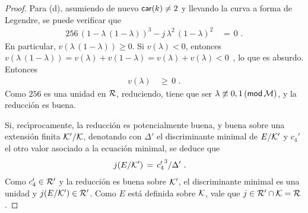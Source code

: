 \begin{proof}
	Para (d), asumiendo de nuevo $\char{k}\not=2$ y llevando la curva a
	forma de Legendre, se puede verificar que
	\begin{align*}
		256\,(1-\lambda\,(1-\lambda))^{3}-
			j\,\lambda^{2}\,(1-\lambda)^{2} & \,=\,0
		\text{ .}
	\end{align*}
	En particular, $v(\lambda\,(1-\lambda))\geq0$. Si $v(\lambda)<0$,
	entonces
	\begin{math}
		v(\lambda\,(1-\lambda))=v(\lambda)+v(1-\lambda)=
			v(\lambda)+v(\lambda)<0
	\end{math}~, lo que es absurdo. Entonces
	\begin{align*}
		v(\lambda) & \,\geq\,0
		\text{ .}
	\end{align*}
	Como $256$ es una unidad en $\cal{R}$, reduciendo, tiene que ser
	$\lambda\not\equiv0,1\,(\modulo\,\cal{M})$, y la reducci\'{o}n es
	buena.

	Si, rec\'{\i}procamente, la reducci\'{o}n es potencialmente buena, y
	buena sobre una extensi\'{o}n finita $\cal{K}'/\cal{K}$, denotando con
	$\Delta'$ el discriminante minimal de $E/\cal{K}'$ y $c_4'$ el otro
	valor asociado a la ecuaci\'{o}n minimal, se deduce que
	\begin{align*}
		j(E/\cal{K}') & \,=\,{c_4'}^{3}/\Delta'
		\text{ .}
	\end{align*}
	Como $c_4'\in\cal{R}'$ y la reducci\'{o}n es buena sobre $\cal{K}'$, el
	discriminante minimal es una unidad y $j(E/\cal{K}')\in\cal{R}'$. Como
	$E$ est\'{a} definida sobre $\cal{K}$, vale que
	$j\in\cal{R}'\cap\cal{K}=\cal{R}$.
\end{proof}
